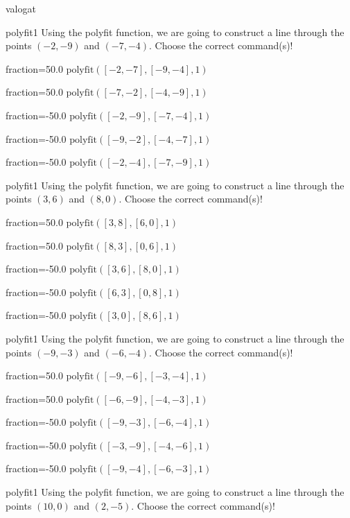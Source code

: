 \documentclass[12pt]{article}
\begin{document}
\begin{quiz}{valogat}
\begin{multi}[multiple]{polyfit1}
Using the polyfit function, we are going to construct a line through the points $\left(-2,-9\right)$ and $\left(-7,-4\right)$.
Choose the correct command(s)!

\item[fraction=50.0] $\mathrm{polyfit}([-2,-7], [-9,-4], 1)$
\item[fraction=50.0] $\mathrm{polyfit}([-7,-2], [-4,-9], 1)$
\item[fraction=-50.0]  $\mathrm{polyfit}([-2,-9], [-7,-4], 1)$
\item[fraction=-50.0]  $\mathrm{polyfit}([-9,-2], [-4,-7], 1)$
\item[fraction=-50.0]  $\mathrm{polyfit}([-2,-4], [-7,-9], 1)$
\end{multi}
\begin{multi}[multiple]{polyfit1}
Using the polyfit function, we are going to construct a line through the points $\left(3,6\right)$ and $\left(8,0\right)$.
Choose the correct command(s)!

\item[fraction=50.0] $\mathrm{polyfit}([3,8], [6,0], 1)$
\item[fraction=50.0] $\mathrm{polyfit}([8,3], [0,6], 1)$
\item[fraction=-50.0]  $\mathrm{polyfit}([3,6], [8,0], 1)$
\item[fraction=-50.0]  $\mathrm{polyfit}([6,3], [0,8], 1)$
\item[fraction=-50.0]  $\mathrm{polyfit}([3,0], [8,6], 1)$
\end{multi}
\begin{multi}[multiple]{polyfit1}
Using the polyfit function, we are going to construct a line through the points $\left(-9,-3\right)$ and $\left(-6,-4\right)$.
Choose the correct command(s)!

\item[fraction=50.0] $\mathrm{polyfit}([-9,-6], [-3,-4], 1)$
\item[fraction=50.0] $\mathrm{polyfit}([-6,-9], [-4,-3], 1)$
\item[fraction=-50.0]  $\mathrm{polyfit}([-9,-3], [-6,-4], 1)$
\item[fraction=-50.0]  $\mathrm{polyfit}([-3,-9], [-4,-6], 1)$
\item[fraction=-50.0]  $\mathrm{polyfit}([-9,-4], [-6,-3], 1)$
\end{multi}
\begin{multi}[multiple]{polyfit1}
Using the polyfit function, we are going to construct a line through the points $\left(10,0\right)$ and $\left(2,-5\right)$.
Choose the correct command(s)!


\end{multi}
\end{quiz}
\end{document}
